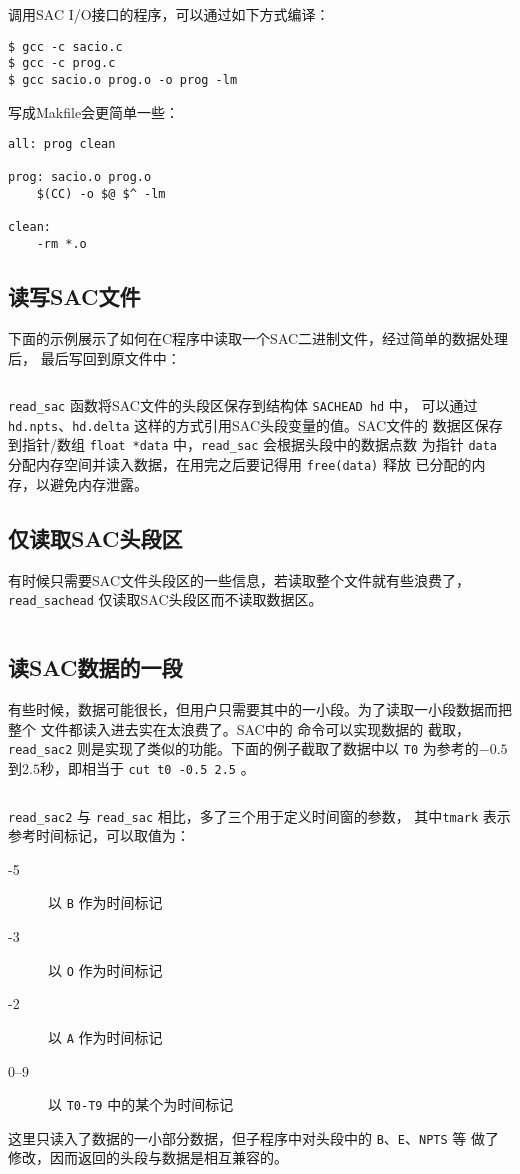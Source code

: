 调用SAC I/O接口的程序，可以通过如下方式编译：
\begin{verbatim}
$ gcc -c sacio.c
$ gcc -c prog.c
$ gcc sacio.o prog.o -o prog -lm
\end{verbatim}

写成Makfile会更简单一些：
\begin{verbatim}
all: prog clean

prog: sacio.o prog.o
    $(CC) -o $@ $^ -lm

clean:
    -rm *.o
\end{verbatim}

\subsection{读写SAC文件}
下面的示例展示了如何在C程序中读取一个SAC二进制文件，经过简单的数据处理后，
最后写回到原文件中：
\inputminted{C}{./sacio/readsac.c}
\verb|read_sac| 函数将SAC文件的头段区保存到结构体 \texttt{SACHEAD hd} 中，
可以通过 \texttt{hd.npts}、\texttt{hd.delta} 这样的方式引用SAC头段变量的值。SAC文件的
数据区保存到指针/数组 \texttt{float *data} 中，\verb|read_sac| 会根据头段中的数据点数
为指针 \texttt{data} 分配内存空间并读入数据，在用完之后要记得用 \texttt{free(data)} 释放
已分配的内存，以避免内存泄露。

\subsection{仅读取SAC头段区}
有时候只需要SAC文件头段区的一些信息，若读取整个文件就有些浪费了，
\verb|read_sachead| 仅读取SAC头段区而不读取数据区。
\inputminted{C}{./sacio/readsachead.c}

\subsection{读SAC数据的一段}
有些时候，数据可能很长，但用户只需要其中的一小段。为了读取一小段数据而把整个
文件都读入进去实在太浪费了。SAC中的  命令可以实现数据的
截取，\verb|read_sac2| 则是实现了类似的功能。下面的例子截取了数据中以 \texttt{T0}
为参考的$-0.5$到$2.5$秒，即相当于 \texttt{cut t0 -0.5 2.5} 。
\inputminted{C}{./sacio/readsac2.c}
\verb|read_sac2| 与 \verb|read_sac| 相比，多了三个用于定义时间窗的参数，
其中\texttt{tmark} 表示参考时间标记，可以取值为：
\begin{description}
\item[-5] 以 \texttt{B} 作为时间标记
\item[-3] 以 \texttt{O} 作为时间标记
\item[-2] 以 \texttt{A} 作为时间标记
\item[0--9] 以 \texttt{T0-T9} 中的某个为时间标记
\end{description}
这里只读入了数据的一小部分数据，但子程序中对头段中的 \texttt{B}、\texttt{E}、\texttt{NPTS} 等
做了修改，因而返回的头段与数据是相互兼容的。


